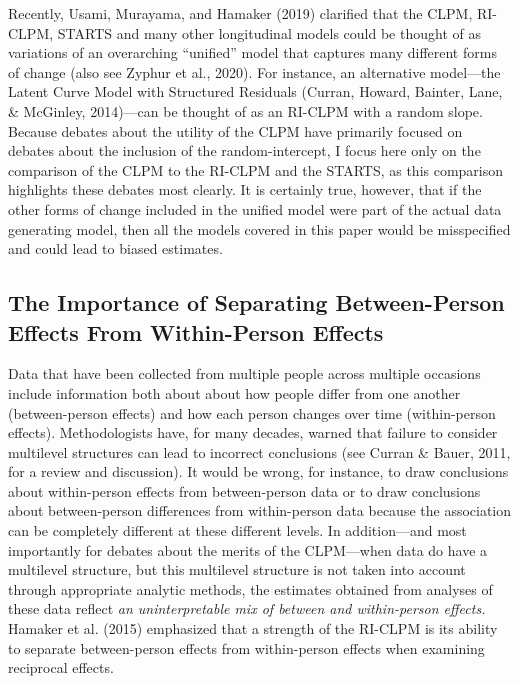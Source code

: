 \documentclass[
  english,
  man,floatsintext]{apa6}
\begin{document}
Recently, Usami, Murayama, and Hamaker (2019) clarified that the CLPM, RI-CLPM, STARTS and many other longitudinal models could be thought of as variations of an overarching ``unified'' model that captures many different forms of change (also see Zyphur et al., 2020). For instance, an alternative model---the Latent Curve Model with Structured Residuals (Curran, Howard, Bainter, Lane, \& McGinley, 2014)---can be thought of as an RI-CLPM with a random slope. Because debates about the utility of the CLPM have primarily focused on debates about the inclusion of the random-intercept, I focus here only on the comparison of the CLPM to the RI-CLPM and the STARTS, as this comparison highlights these debates most clearly. It is certainly true, however, that if the other forms of change included in the unified model were part of the actual data generating model, then all the models covered in this paper would be misspecified and could lead to biased estimates.

\hypertarget{the-importance-of-separating-between-person-effects-from-within-person-effects}{%
\subsection{The Importance of Separating Between-Person Effects From Within-Person Effects}\label{the-importance-of-separating-between-person-effects-from-within-person-effects}}

Data that have been collected from multiple people across multiple occasions include information both about about how people differ from one another (between-person effects) and how each person changes over time (within-person effects). Methodologists have, for many decades, warned that failure to consider multilevel structures can lead to incorrect conclusions (see Curran \& Bauer, 2011, for a review and discussion). It would be wrong, for instance, to draw conclusions about within-person effects from between-person data or to draw conclusions about between-person differences from within-person data because the association can be completely different at these different levels. In addition---and most importantly for debates about the merits of the CLPM---when data do have a multilevel structure, but this multilevel structure is not taken into account through appropriate analytic methods, the estimates obtained from analyses of these data reflect \emph{an uninterpretable mix of between and within-person effects.} Hamaker et al. (2015) emphasized that a strength of the RI-CLPM is its ability to separate between-person effects from within-person effects when examining reciprocal effects.
\end{document}
